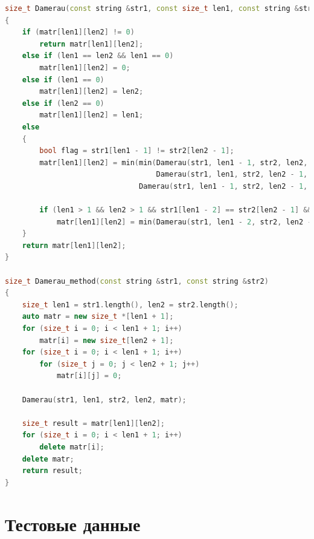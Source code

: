 \documentclass[12pt]{report}
\begin{document}
\begin{lstlisting}[label=some-code,caption=Функция нахождения расстояния Дамерау-Левенштейна матрично,language=C++]
size_t Damerau(const string &str1, const size_t len1, const string &str2, const size_t len2, size_t **matr)
{
    if (matr[len1][len2] != 0)
        return matr[len1][len2];
    else if (len1 == len2 && len1 == 0)
        matr[len1][len2] = 0;
    else if (len1 == 0)
        matr[len1][len2] = len2;
    else if (len2 == 0)
        matr[len1][len2] = len1;
    else 
    {
        bool flag = str1[len1 - 1] != str2[len2 - 1];
        matr[len1][len2] = min(min(Damerau(str1, len1 - 1, str2, len2, matr) + 1,
                                   Damerau(str1, len1, str2, len2 - 1, matr) + 1),
                               Damerau(str1, len1 - 1, str2, len2 - 1, matr) + flag);

        if (len1 > 1 && len2 > 1 && str1[len1 - 2] == str2[len2 - 1] && str1[len1 - 1] == str2[len2 - 2])
            matr[len1][len2] = min(Damerau(str1, len1 - 2, str2, len2 - 2, matr) + 1, matr[len1][len2]);
    }
    return matr[len1][len2];
}

size_t Damerau_method(const string &str1, const string &str2)
{
    size_t len1 = str1.length(), len2 = str2.length();
    auto matr = new size_t *[len1 + 1];
    for (size_t i = 0; i < len1 + 1; i++)
        matr[i] = new size_t[len2 + 1];
    for (size_t i = 0; i < len1 + 1; i++)
        for (size_t j = 0; j < len2 + 1; j++)
            matr[i][j] = 0;

    Damerau(str1, len1, str2, len2, matr);

    size_t result = matr[len1][len2];
    for (size_t i = 0; i < len1 + 1; i++)
        delete matr[i];
    delete matr;
    return result;
}

\end{lstlisting}

\section{Тестовые данные}
\end{document}
